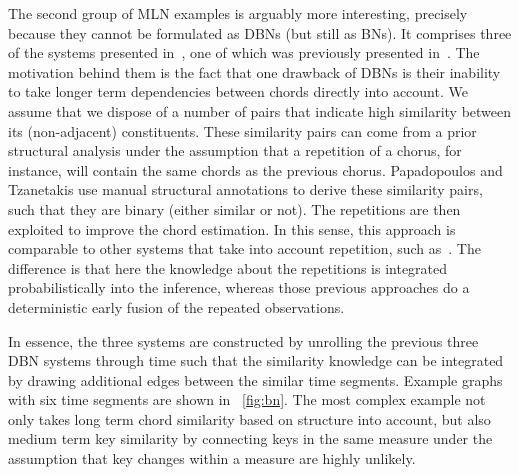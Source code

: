\documentclass[letterpaper]{article} %
\newcommand{\figref}[1]{\figurename~\ref{fig:#1}} %
\begin{document}
The second group of MLN examples is arguably more interesting, precisely because they cannot be formulated as DBNs (but still as BNs). It comprises three of the systems presented in~\cite{papadopoulos2017taslp}, one of which was previously presented in~\cite{papadopoulos2013icassp}. The motivation behind them is the fact that one drawback of DBNs is their inability to take longer term dependencies between chords directly into account. We assume that we dispose of a number of pairs that indicate high similarity between its (non-adjacent) constituents. These similarity pairs can come from a prior structural analysis under the assumption that a repetition of a chorus, for instance, will contain the same chords as the previous chorus. Papadopoulos and Tzanetakis use manual structural annotations to derive these similarity pairs, such that they are binary (either similar or not). The repetitions are then exploited to improve the chord estimation. In this sense, this approach is comparable to other systems that take into account repetition, such as~\cite{mauch2009ismir,cho2011ismir}. The difference is that here the knowledge about the repetitions is integrated probabilistically into the inference, whereas those previous approaches do a deterministic early fusion of the repeated observations.



In essence, the three systems are constructed by unrolling the previous three DBN systems through time such that the similarity knowledge can be integrated by drawing additional edges between the similar time segments. Example graphs with six time segments are shown in \figref{bn}. The most complex example not only takes long term chord similarity based on structure into account, but also medium term key similarity by connecting keys in the same measure under the assumption that key changes within a measure are highly unlikely.
\end{document}
